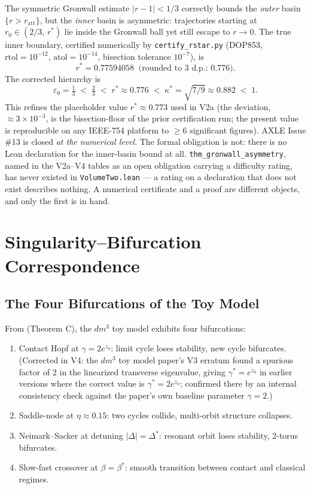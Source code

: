 \documentclass[11pt]{article}
\theoremstyle{boxed}
\begin{document}
The symmetric Gronwall estimate $|r - 1| < 1/3$ correctly bounds the \emph{outer}
basin $\{r > r_{\mathrm{att}}\}$, but the \emph{inner} basin is asymmetric: trajectories
starting at $r_0 \in (2/3,\, r^{*})$ lie inside the Gronwall ball yet still escape to
$r \to 0$. The true inner boundary, certified numerically by \texttt{certify\_rstar.py}
(DOP853, $\mathrm{rtol}=10^{-12}$, $\mathrm{atol}=10^{-14}$, bisection tolerance $10^{-7}$), is
\[
r^{*} = 0.77594058 \;\;\text{(rounded to 3 d.p.: } 0.776\text{)}.
\]
The corrected hierarchy is
\[
\varepsilon_0 = \tfrac{1}{3} \;<\; \tfrac{2}{3} \;<\; r^{*} \approx 0.776 \;<\; \kappa^{*} = \sqrt{7/9} \approx 0.882 \;<\; 1.
\]
This refines the placeholder value $r^{*} \approx 0.773$ used in V2a (the deviation,
$\approx 3\times 10^{-3}$, is the bisection-floor of the prior certification run; the
present value is reproducible on any IEEE-754 platform to $\geq 6$ significant figures).
AXLE Issue \#13 is closed \emph{at the numerical level}. The formal obligation is not: there is
no Lean declaration for the inner-basin bound at all. \texttt{thm\_gronwall\_asymmetry}, named in
the V2a--V4 tables as an open obligation carrying a difficulty rating, has never existed in
\texttt{VolumeTwo.lean} --- a rating on a declaration that does not exist describes nothing. A
numerical certificate and a proof are different objects, and only the first is in hand.

\section{Singularity--Bifurcation Correspondence}

\subsection{The Four Bifurcations of the Toy Model}

From \cite{dm3} (Theorem C), the $dm^3$ toy model exhibits four bifurcations:
\begin{enumerate}[label=(\roman*)]
  \item Contact Hopf at $\gamma = 2e^{z_0}$: limit cycle loses stability, new cycle bifurcates. (Corrected in V4: the $dm^3$ toy model paper's V3 erratum found a spurious factor of 2 in the linearized transverse eigenvalue, giving $\gamma^{*}=e^{z_0}$ in earlier versions where the correct value is $\gamma^{*}=2e^{z_0}$; confirmed there by an internal consistency check against the paper's own baseline parameter $\gamma=2$.)
  \item Saddle-node at $\eta \approx 0.15$: two cycles collide, multi-orbit structure collapses.
  \item Neimark--Sacker at detuning $|\Delta| = \Delta^{*}$: resonant orbit loses stability, 2-torus bifurcates.
  \item Slow-fast crossover at $\beta = \beta^{*}$: smooth transition between contact and classical regimes.
\end{enumerate}
\end{document}
